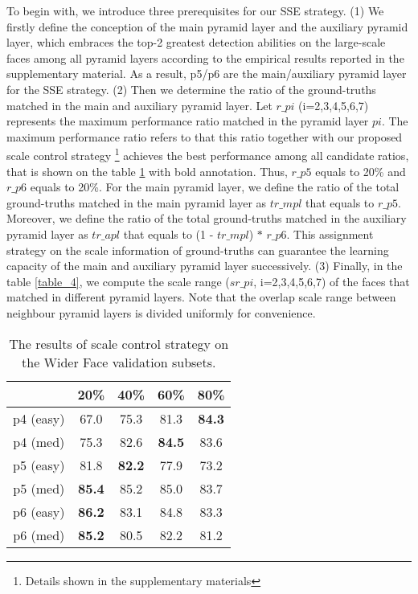 \documentclass[10pt,twocolumn,letterpaper]{article}
\begin{document}
To begin with, we introduce three prerequisites for our SSE strategy. 
(1) We firstly define the conception of the main pyramid layer and the auxiliary pyramid layer, which embraces the top-2 greatest detection abilities on the large-scale faces among all pyramid layers according to the empirical results reported in the supplementary material. As a result, p5/p6 are the main/auxiliary pyramid layer for the SSE strategy. 
(2) Then we determine the ratio of the ground-truths matched in the main and auxiliary pyramid layer. Let $r\_pi$ (i=2,3,4,5,6,7) represents the maximum performance ratio matched in the pyramid layer $pi$. The maximum performance ratio refers to that this ratio together with our proposed scale control strategy \footnote{Details shown in the supplementary materials} achieves the best performance  among all candidate ratios, that is shown on the table \ref{table_0} with bold annotation. Thus, $r\_p5$ equals to 20\%  and $r\_p6$ equals to 20\%.  
For the main pyramid layer, we define the ratio of the total ground-truths matched in the main pyramid layer as $tr\_mpl$ that equals to $r\_p5$. Moreover, we define the  ratio of the total ground-truths matched in the auxiliary pyramid layer as $tr\_apl$ that equals to (1 - $tr\_mpl$) $*$ $r\_p6$. This assignment strategy on the scale information of ground-truths can guarantee the learning capacity of the main and auxiliary pyramid layer successively. 
(3) Finally, in the table \ref{table_4}, we compute the scale range ($sr\_pi$, i=2,3,4,5,6,7) of the faces that matched in different pyramid layers. 
Note that the overlap scale range between neighbour pyramid layers is divided uniformly for convenience. 

\begin{table}[h]
\small
\renewcommand\arraystretch{1.1}
	\begin{center}
	\setlength{\tabcolsep}{10pt}
	\begin{tabular}{c|cccc}
		\hline
		   & 20\%  & 40\% & 60\% & 80\% \\
		\hline
        p4 (easy) &67.0 &75.3 &81.3 & \textbf{84.3} \\
        p4 (med) &75.3 &82.6 &\textbf{84.5} & 83.6 \\
        p5 (easy) &81.8 &\textbf{82.2} &77.9 & 73.2 \\
        p5 (med) &\textbf{85.4} &85.2 &85.0 & 83.7 \\
        p6 (easy) &\textbf{86.2} &83.1 &84.8 & 83.3 \\
        p6 (med) & \textbf{85.2} & 80.5 & 82.2 & 81.2 \\
		\hline				
	\end{tabular}
	\end{center}
\vspace{-10pt}
\caption{The results of scale control strategy on the Wider Face validation subsets.
}
\label{table_0}
\end{table}
\end{document}
